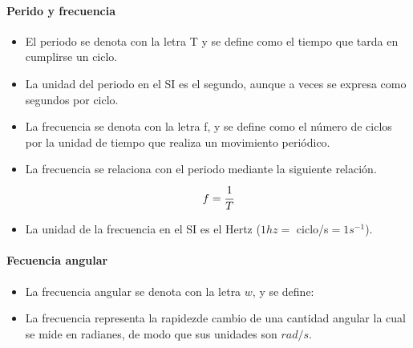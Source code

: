 \paragraph{Perido y frecuencia}
\begin{itemize}[label=\textbf{$\bullet$},itemsep=2pt,partopsep=6pt,parsep=6pt]
	\item El periodo se denota con la letra T y se define como el tiempo que tarda en cumplirse un ciclo.
	\item La unidad del periodo en el SI es el segundo, aunque a veces se expresa como segundos por ciclo.
	\item La frecuencia se denota con la letra f, y se define como el número de ciclos por la unidad de tiempo que realiza un movimiento periódico.
	\item La frecuencia se relaciona con el periodo mediante la siguiente relación.
	      \[f=\cfrac{1}{T}\]
	\item La unidad de la frecuencia en el SI es el Hertz ($1hz=$ ciclo/s$=1{s}^{-1}$).
\end{itemize}
\paragraph{Fecuencia angular}
\begin{itemize}[label=\textbf{$\bullet$},itemsep=2pt,partopsep=6pt,parsep=6pt]
	\item La frecuencia angular se denota con la letra $w$, y se define:
	\item La frecuencia representa la rapidezde cambio de una cantidad angular la cual se mide en radianes, de modo que sus unidades son $rad/s$.
\end{itemize}
